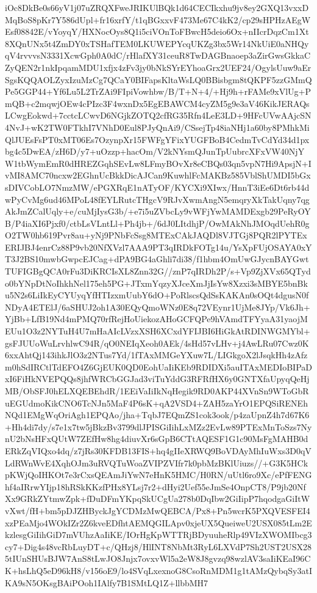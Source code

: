 {{{{iOc8DkBe0s66yV1j07uZRQXFweJRIKUlBQk\nJycjPT1d64CECIkxhu9jv8ey2GXQ13vxxDMqBoS8pKr7Y586dUpl+fr16xrfY/t1qBGxxvF473Me\nMzHGR67C4kK2/cp29sHPHzAEgWEsf08842E/vYoyqY/HXNocOys8Q1i5ciVOnToFBwcH5deio6Ox\ndevWGihThLy+nIIcrDqzCm1Xt8XQnUNx5t4ZmDY0xTSHafTEM0LKUWEPYcqUKZg3bx5Wr14NkUiE\n0aNHQyqV4rvvvsN3331XcwGph0A0dC/rHlafXY31ceuR8TwDAGBnaoep3aZirGwsGkkaCZyQEN2r\n1nkIpqamMDU1xfjx4zFv3jy0bNkSYrEYhoaGrx2UEF24/OgylsUuw9aErSgsKQQAOLZyxIzuMzCg\n7QCaY0BIFapsKltaWsLQ0BBisbgm8tQKPF5zzGMmQPe5GGP44+Yf6Lu5L2TrZAi9FIpiVowhbw/B\nad/T+N+4/+Hj9h+rFAMe9xVlUg+PmQB+c2mqwjOEw4cPIzc3F4wxnDx5EgEBAWCM4cyZM5g9e3aV\nG46KikJERAQsLCwgEokwd+7cctcLCwvD6NGjkZOTQ2cfRG35Rfn4LeE3LD+9HFcUVwAAjcSN4NvJ+wK2TW0FTkhI7VNhD0Eul8PJyQnAi9/CSsejTp48iaNHj1a60by8PMhkMiQlJUEsFsPT0xMT\nJ06Es7OzynpXr15FWFgYFixYUGFBoB4CedmTvCdYd34d1pxbg4c5DwEA/zH6D/y7+uOzzp+hacOm\nAickhA/V2kNYsmQJunTpUubrcXFxVW40NjYW1tbWymEmR0dHREZGqhSEvLw8LFmyBOvXr8eCBQs0\nCk3qn5vpN7Hi9ApsjN+IvMI8AMC70ncxw2EGhnUcBkkDicAJCan9KuwhlFcMAKBz585VblShUMDI\nyEi5bGxsDIVCobLO7NmzMW/ePGXRqE1nATyOF/KYCXi9XIwx/HnnT3iEe6Dt6rb44dwPyCvMg6ud\nK46MPoL48fEYLRutcTHgcV9RJvXwmAngN5emqryXkTakUqny7qgAkJmZCalUqly+e/cuMjIysG3b\nNuXXvv/+e7i5uZVbcLy9vWFjYwMAMDExgb29PeRyOYB/P4iaXI6Pjxf0/ctbLsVLntLl+Ph4jb+/\nuKQY6dJ0LItdhjP/OwMAkNhJMOqdUehR0gO2TW0hb619Pvr8au+yNj9PNbFcSsg8MTExCAkJAQDl\n8VJTGj8PQR2lPYTExERIJBJ4enrCz88P9vb20NfXVzl7AAA9PT3qIRDkFOTg14u/YsXpFUjOSAYA\nmDY0xYT3J2BS10mwbGwpcEJCag+dPA9BG4aGhli7di38/f1hbm4OmUwGJycnBAYGwtTUFIGBgQCA\ntLQ0rFu3DiKRCIsXL8Znn32G//znP7qIRDh2P/s+Vp9ZjXVx65QTydo0bYNpDtNoIhkhNel175eh\nazxG5PG+JTxmYqzyXJceXmJjIsYw8Xzxi3sMBYE5bnBku5N2s6LiIkEyCYUyqYfHTIzxmUubY6dO\nzhAIqQhjDIf+PoRlscsQdSsKAKAn0sOQt4dgusN0fNDyA4ETElJ/6aSHUJ2oh1A30EQyQmoWNz0E\nQkrRRDJCao8q72VEynr1UjMe8JYp/Vk6Jh+YjBb+LfB19Nd4mPMQ70rfRejHoUiekozAHoGCFQPe\n9hVAmdTFYyaA31yaojMEUu1O3z2NYTuH4U7mHaAIcLVzxXSH6XCxdYFIJBI6HiGkAtRDINWGMYbl+gsFJUUoWuLrvhlwC94R/qO0NEIqXeoh0AEk/4sHd57vLHv+j4AwLRu07Cwz0K6xxAhtQj1\nELTA43ihkJlO3z2NTus7Yd/1fTAxMMGeYXuw7L/LIGkgoX2lJsqkHh4zAfzm0hSdIRCtlTdEFO4Z\nDhsTG6GjEUK0QD0EohUaIiKEb9RDIDXi5auITAxMEDIoBIPaDxI6FiHkNVEPQQs8jhfWRCbGGJad\nWoaeG3viTuYddG3RFRfHX6y0GNTXfaUpyqQeHjMB/ObSFJ0hELXQEBEhdR/1EEiVaIiIkNqHegik\nWtFVRITUL9RD0AKP44XVnSn9WToGbRuEGUdmoKikCNO6TcNJn5MaF4P6sK+qA2VSD4+ZAH5zaYrO\nEEgZNERESP1EPQSiRENEhNQd1EMgWqOriAgh1EPQAo/jha+TqbJ7EQmZS1cok3ook/p4zaUpnZ4h\nREVFISIiAhYWFhCJRJg7d67K6+Hh4di7dy/s7e1x7tw5jBkzBv3799dlJPISGiIihLxMZz2EvLw8\nyGQyJCUlQSwWw9PTExMnToSzs7NynU2bNsHFxQUtW7ZEfHw8hg4diuvXr6sGpB6CTtAQESF1G1c9\nhNjYWFhbW0MsFgMAHB0dERkZqVIQxo4dq/z7jRs30KFDB13FIS+hq4gIIeXRWQ9BoVDAyMhIuWxs\nbAyFQlFmvefPnyMwMBDLli3D0qVLdRWnWvE4XqhOJm3uRVQTuWoaZVIPZVIfr7k0pbMzBKlUiuzs\nbOVyZmYmpFJpmfUMDAwQHByMv//+G3K5HCkpKWjQoIHKOt7e3rCxsQEAmJiYwN7eHnK5HMC/H0RN/uUtl6ro9Xc/ePfFENGhf4aIRrwYIjp18hRSkKKzfPHx8YLsj7r2+dHyi2Uef55eJmSe\nmJgYhISEAIDyeKkpnfcQEhMTIZFI4OnpCT8/P9jb20NfXx9GRkZYtmwZpk+fDuDFmYKpqSkUCgUa\nN278b0DqIbw2GiIipP7hqodgaGiItWvXwt/fH+bm5pDJZHByckJgYCDMzMwQEBCA/Px8+Pn5wcrK\nClevXsWqVatUigF5PXQVESFEI4xzPEaMjo4WOkIZr2Z6kveEDfhtAEMQGILApv0xjeUX5QueiweU\nST2USX085tLm2EkzlesgGiIihGiD7mVUhzAaIiKE/IOrHgKpWTTRjBDyuuheRlp49VIzXWOMIbcg\nF3cy7+Dig4s48vcRbLuyDT+c/QHzj8/HlINT8NbMt3RyL6LXVdP7Sh2UST2USX285tIUnSHUsBJW\ngsznmXjy7AnS8tLwJO8Jnjx7ovxvWl5a2eW8J8gvzq98wzlAV3saIiKEaI96CK+hsLhQ5eD96kH8\nybN/v156oE9/lo4SVqLxexnoG8CsoRnMDM1g1tAMzQybqSy3atIKA9sN5OKsgBAiPOoh1IAlfy7B\nurh1SMtLQ1Z+llbbMH7}}}}
